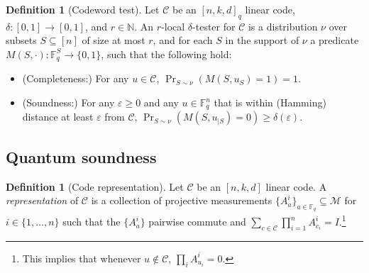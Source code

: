 \documentclass[11pt]{article}
\theoremstyle{definition}
\newtheorem{definition}[theorem]{Definition}
\newcommand{\code}{\mathcal{C}}
\newcommand{\Id}{\ensuremath{I}}
\newcommand{\field}{\mathbb{F}_2}
\newcommand{\N}{\ensuremath{\mathbb{N}}}
\newcommand{\F}{\ensuremath{\mathbb{F}}}
\newcommand{\mM}{\ensuremath{\mathcal{M}}}
\newcommand{\eps}{\varepsilon}
\begin{document}
\begin{definition}[Codeword test]\label{def:code-test}
Let $\code$ be an $[n,k,d]_q$ linear code, $\delta:[0,1]\to[0,1]$, and $r\in \N$.
An $r$-local $\delta$-tester for $\code$ is a distribution $\nu$ over subsets $S\subseteq [n]$ of size at most $r$, and for each $S$ in the support of $\nu$ a predicate $M(S,\cdot):\F_q^S\to\{0,1\}$, such that the following hold:
\begin{itemize} 
\item (Completeness:) For any $u\in \code$, $\Pr_{S\sim \nu}( M(S,u_S)=1)=1$.
\item (Soundness:) For any $\eps\geq 0$ and any $u\in \F_q^n$ that is within (Hamming) distance at least  $\eps$ from $\code$, $\Pr_{S\sim\nu}(M(S,u_{|S})=0)\geq \delta(\eps)$. 
\end{itemize}
\end{definition}


\subsection{Quantum soundness}
\label{sec:q-soundness}

\begin{definition}[Code representation]
Let $\code$ be an $[n,k,d]$ linear code. A \emph{representation} of $\code$ is a collection of projective measurements $\{A^i_a\}_{a\in\F_q} \subseteq\mM$ for $i\in\{1,\ldots,n\}$ such that the $\{A^i_a\}$ pairwise commute and $\sum_{c\in\code} \prod_{i=1}^n A^i_{c_i}=\Id$.\footnote{This implies that whenever $u\notin \code$, $\prod_i A^i_{u_i}=0$.} 
\end{definition}
\end{document}
